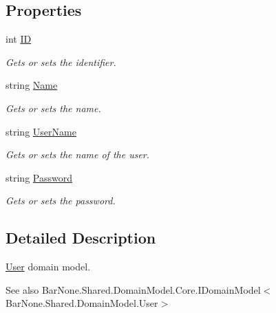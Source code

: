 \subsection*{Properties}
\begin{DoxyCompactItemize}
\item 
int \mbox{\hyperlink{class_bar_none_1_1_shared_1_1_domain_model_1_1_user_a9f2aacdeb9aca2be6a90f598c15fde0e}{ID}}
\begin{DoxyCompactList}\small\item\em Gets or sets the identifier. \end{DoxyCompactList}\item 
string \mbox{\hyperlink{class_bar_none_1_1_shared_1_1_domain_model_1_1_user_a5d0d39c755d6cf6ae46bb6f5f8a1453d}{Name}}
\begin{DoxyCompactList}\small\item\em Gets or sets the name. \end{DoxyCompactList}\item 
string \mbox{\hyperlink{class_bar_none_1_1_shared_1_1_domain_model_1_1_user_a664cea63b485b0597fe6a71394e8c600}{User\+Name}}
\begin{DoxyCompactList}\small\item\em Gets or sets the name of the user. \end{DoxyCompactList}\item 
string \mbox{\hyperlink{class_bar_none_1_1_shared_1_1_domain_model_1_1_user_a3abd715ad9736199ab222275097b2ea0}{Password}}
\begin{DoxyCompactList}\small\item\em Gets or sets the password. \end{DoxyCompactList}\end{DoxyCompactItemize}


\subsection{Detailed Description}
\mbox{\hyperlink{class_bar_none_1_1_shared_1_1_domain_model_1_1_user}{User}} domain model. 

\begin{DoxySeeAlso}{See also}
Bar\+None.\+Shared.\+Domain\+Model.\+Core.\+I\+Domain\+Model$<$\+Bar\+None.\+Shared.\+Domain\+Model.\+User$>$


\end{DoxySeeAlso}


